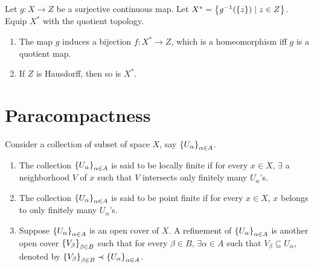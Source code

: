 \begin{cl}
    Let $g: X\to Z$ be a surjective continuous map. Let $X^* = {\left\{{g^{-1}({\left\{{z}\right\}}) \mid z\in Z}\right\}}$. Equip $X^*$ with the quotient topology. 
    \begin{enumerate}[label={(\alph*)}]
        \item The map $g$ induces a bijection $f: X^*\to Z$, which is a homeomorphism iff $g$ is a quotient map.
        \item If $Z$ is Hausdorff, then so is $X^*$.
    \end{enumerate}
\end{cl}

\section{Paracompactness}

\begin{df}
    Consider a collection of subset of space $X$, say ${\left\{{U_\alpha}\right\}}_{\alpha\in A}$. 
    \begin{enumerate}
        \item The collection ${\left\{{U_\alpha}\right\}}_{\alpha\in A}$ is said to be locally finite if for every $x\in X$, $\exists$ a neighborhood $V$ of $x$ such that $V$ intersects only finitely many $U_\alpha$'s.
        \item The collection ${\left\{{U_\alpha}\right\}}_{\alpha\in A}$ is said to be point finite if for every $x\in X$, $x$ belongs to only finitely many $U_\alpha$'s.
        \item Suppose ${\left\{{U_\alpha}\right\}}_{\alpha\in A}$ is an open cover of $X$. A refinement of ${\left\{{U_\alpha}\right\}}_{\alpha\in A}$ is another open cover ${\left\{{V_\beta}\right\}}_{\beta\in B}$ such that for every $\beta\in B$, $\exists \alpha\in A$ such that $V_\beta \subseteq U_\alpha$, denoted by ${\left\{{V_\beta}\right\}}_{\beta\in B} \prec {\left\{{U_\alpha}\right\}}_{\alpha\in A}$.
    \end{enumerate}
\end{df}

